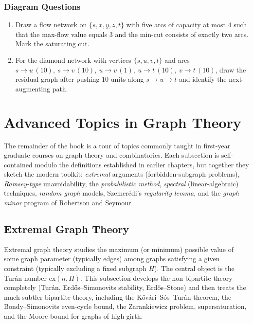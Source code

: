 \documentclass{article}
\theoremstyle{definition}
\begin{document}
\subsubsection{Diagram Questions}

\begin{enumerate}[resume]
\item Draw a flow network on $\{s, x, y, z, t\}$ with five arcs of capacity
at most $4$ such that the max-flow value equals $3$ and the
min-cut consists of exactly two arcs. Mark the saturating cut.

\item For the diamond network with vertices $\{s, u, v, t\}$ and arcs
$s\to u\,(10),\ s\to v\,(10),\ u\to v\,(1),\ u\to t\,(10),\ v\to t\,(10)$,
draw the residual graph after pushing $10$ units along $s \to u \to t$
and identify the next augmenting path.
\end{enumerate}

\clearpage
\section{Advanced Topics in Graph Theory}\label{sec:advanced-topics}

The remainder of the book is a tour of topics commonly taught in
first-year graduate courses on graph theory and combinatorics. Each
subsection is self-contained modulo the definitions established in
earlier chapters, but together they sketch the modern toolkit:
\emph{extremal} arguments (forbidden-subgraph problems),
\emph{Ramsey-type} unavoidability, the \emph{probabilistic method},
\emph{spectral} (linear-algebraic) techniques, \emph{random graph}
models, Szemer\'edi's \emph{regularity lemma}, and the
\emph{graph minor} program of Robertson and Seymour.

\subsection{Extremal Graph Theory}

Extremal graph theory studies the maximum (or minimum) possible value
of some graph parameter (typically edges) among graphs satisfying a
given constraint (typically excluding a fixed subgraph $H$). The
central object is the Tur\'an number $\mathrm{ex}(n, H)$. This
subsection develops the non-bipartite theory completely (Tur\'an,
Erd\H{o}s--Simonovits stability, Erd\H{o}s--Stone) and then treats
the much subtler bipartite theory, including the K\H{o}v\'ari--S\'os--Tur\'an
theorem, the Bondy--Simonovits even-cycle bound, the Zarankiewicz
problem, supersaturation, and the Moore bound for graphs of high girth.
\end{document}
